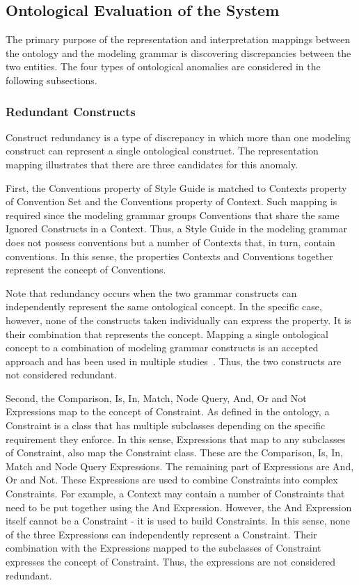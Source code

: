 \subsection{Ontological Evaluation of the System}

The primary purpose of the representation and interpretation mappings between
the ontology and the modeling grammar is discovering discrepancies between the
two entities. The four types of ontological anomalies are considered in the
following subsections.

\subsubsection{Redundant Constructs} 

Construct redundancy is a type of discrepancy in which more than one modeling
construct can represent a single ontological construct. The representation
mapping illustrates that there are three candidates for this anomaly.

First, the Conventions property of Style Guide is matched to Contexts property
of Convention Set and the Conventions property of Context. Such mapping is
required since the modeling grammar groups Conventions that share the same
Ignored Constructs in a Context. Thus, a Style Guide in the modeling grammar
does not possess conventions but a number of Contexts that, in turn, contain
conventions. In this sense, the properties Contexts and Conventions together
represent the concept of Conventions.

Note that redundancy occurs when the two grammar constructs can independently
represent the same ontological concept. In the specific case, however, none of
the constructs taken individually can express the property. It is their
combination that represents the concept. Mapping a single ontological concept
to a combination of modeling grammar constructs is an accepted approach and
has been used in multiple studies~\cite{gehlert2007toward}. Thus, the two
constructs are not considered redundant.

Second, the Comparison, Is, In, Match, Node Query, And, Or and Not Expressions
map to the concept of Constraint. As defined in the ontology, a Constraint is
a class that has multiple subclasses depending on the specific requirement
they enforce. In this sense, Expressions that map to any subclasses of
Constraint, also map the Constraint class. These are the Comparison, Is, In,
Match and Node Query Expressions. The remaining part of Expressions are And,
Or and Not. These Expressions are used to combine Constraints into complex
Constraints. For example, a Context may contain a number of Constraints that
need to be put together using the And Expression. However, the And Expression
itself cannot be a Constraint - it is used to build Constraints. In this
sense, none of the three Expressions can independently represent a Constraint.
Their combination with the Expressions mapped to the subclasses of Constraint
expresses the concept of Constraint. Thus, the expressions are not considered
redundant.

